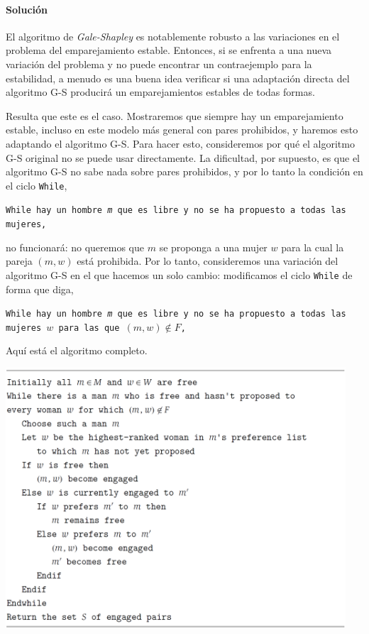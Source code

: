 \documentclass[a4paper, 12pt]{book}
\begin{document}
\paragraph{Solución} El algoritmo de \textit{Gale-Shapley} es notablemente robusto a las variaciones en el problema del emparejamiento estable. Entonces, si se enfrenta a una nueva variación del problema y no puede encontrar un contraejemplo para la estabilidad, a menudo es una buena idea verificar si una adaptación directa del algoritmo G-S producirá un emparejamientos estables de todas formas.

Resulta que este es el caso. Mostraremos que siempre hay un emparejamiento estable, incluso en este modelo más general con pares prohibidos, y haremos esto adaptando el algoritmo G-S. Para hacer esto, consideremos por qué el algoritmo G-S original no se puede usar directamente. La dificultad, por supuesto, es que el algoritmo G-S no sabe nada sobre pares prohibidos, y por lo tanto la condición en el ciclo \texttt{While},

\texttt{While hay un hombre \textit{m} que es libre y no se ha propuesto a todas las mujeres,}

\noindent no funcionará: no queremos que $m$ se proponga a una mujer $w$ para la cual la pareja $(m,w)$ está prohibida. Por lo tanto, consideremos una variación del algoritmo G-S en el que hacemos un solo cambio: modificamos el ciclo \texttt{While} de forma que diga,

\texttt{While hay un hombre \textit{m} que es libre y no se ha propuesto a todas las mujeres $w$ para las que $(m,w) \notin F$,}

Aquí está el algoritmo completo.

\includegraphics[width=0.95\textwidth]{Imagenes-Seccion1/cod1-1.PNG}
\end{document}
